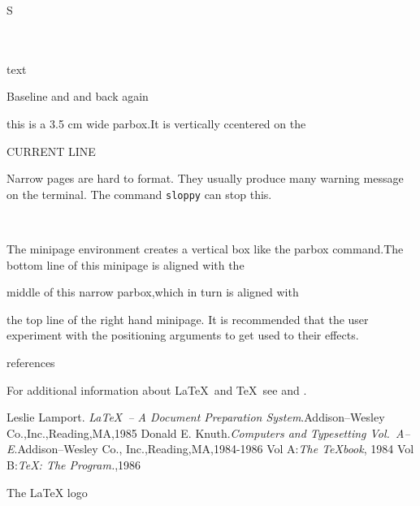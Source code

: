 \documentclass[12pt,twoside,a4paper]{article}   %
\begin{document}
	\makebox[0pt][l]{/}S\\
	\\	%
	\newsavebox{\boxname} %
	\usebox{\boxname}\\ %
	\begin{lrbox}{\boxname}
		text
	\end{lrbox} %
	Baseline \raisebox{1ex}{high} and \raisebox{-1ex}{low}
	and back again\\
	\parbox{3.5cm}{\sloppy this is a 3.5 cm wide parbox.It is vertically ccentered on the}
	\hfill CURRENT LINE \hfill
	\parbox{5.5cm}{Narrow pages are hard to format. They usually produce many warning message on the terminal. The command
	{\tt{}sloppy} can stop this.}\\
	\begin{minipage}[b]{4.3cm}
		The minipage environment creates a vertical box like the parbox command.The bottom line of this minipage is aligned with the
	\end{minipage}\hfill
	\parbox{3.0cm}{middle of this narrow parbox,which in turn is aligned with}
	\hfill
	\begin{minipage}[t]{3.8cm}
		the top line of the right hand minipage. It is recommended that the user experiment with the positioning arguments to get used to their effects.
	\end{minipage}


	\newpage
	\begin{thebibliography}{+} %
		references
	\end{thebibliography}
	\newpage
	For additional information about \LaTeX\ and \TeX\ see \cite{lamport} and \cite{knuth, knuth:a}.
	\begin{thebibliography}{99}
		 Leslie Lamport. \textsl{\LaTeX\ -- A Document Preparation System}.Addison--Wesley Co.,Inc.,Reading,MA,1985
		 Donald E. Knuth.\textsl{Computers and Typesetting Vol.\ A--E}.Addison--Wesley Co., Inc.,Reading,MA,1984-1986
		 Vol A:\textsl{The \TeX book}, 1984
		 Vol B:\textsl{\TeX: The Program.},1986
	\end{thebibliography}
	\newpage
	The \LaTeX{} logo
\end{document}
